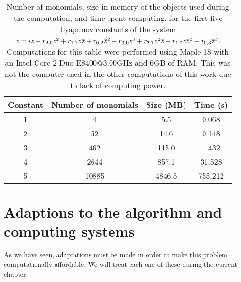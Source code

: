 \begin{table}[H]
\centering
\caption{Number of monomials, size in memory of the objects used during the computation, and time spent computing, for the first five Lyapunov constants of the system $\dot z=iz+r_{2,0}z^2+r_{1,1}z\overline{z}+r_{0,2}\overline{z}^2+r_{3,0}z^3+r_{2,1}z^2\overline{z}+r_{1,2}z\overline{z}^2+r_{0,3}\overline{z}^3$. Computations for this table were performed using Maple 18 with an Intel Core 2 Duo E8400@3.00GHz and 6GB of RAM. This was not the computer used in the other computations of this work due to lack of computing power.}
\label{tab.maple}
\begin{tabular}{|c|c|c|c|}
\hline
Constant & Number of monomials & Size (MB) & Time (s)\\
\hline
1 & 4 & 5.5 & 0.068\\
2 & 52 & 14.6 & 0.148\\
3 & 462 & 115.0 & 1.432\\
4 & 2644 & 857.1 & 31.528\\
5 & 10885 & 4846.5 & 755.212\\
\hline
\end{tabular}
\end{table}


\section{Adaptions to the algorithm and computing systems}
\label{sec.adaptions}


As we have seen, adaptations must be made in order to make this problem computationally affordable. We will treat each one of these during the current chapter:

